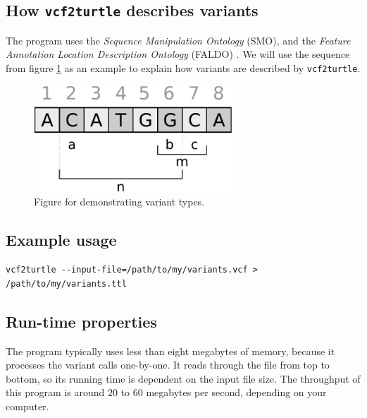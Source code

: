 \documentclass[11pt,a4paper,oneside]{book}
\begin{document}
\subsection{How \texttt{vcf2turtle} describes variants}

  The program uses the \emph{Sequence Manipulation Ontology} (SMO)\cite{unknown},
  and the \emph{Feature Annotation Location Description Ontology} (FALDO)%
  \cite{unknown}.  We will use the sequence from figure \ref{fig:sequence} as
  an example to explain how variants are described by \texttt{vcf2turtle}.

\begin{figure}[H]
  \begin{center}
    \includegraphics[height=4cm]{figures/sequence.pdf}
    \caption{\small Figure for demonstrating variant types.}
    \label{fig:sequence}
  \end{center}
\end{figure}

\subsection{Example usage}

\begin{siderules}
\begin{verbatim}
vcf2turtle --input-file=/path/to/my/variants.vcf > /path/to/my/variants.ttl
\end{verbatim}
\end{siderules}

\subsection{Run-time properties}

  The program typically uses less than eight megabytes of memory, because it
  processes the variant calls one-by-one.  It reads through the file from top
  to bottom, so its running time is dependent on the input file size.  The
  throughput of this program is around $20$ to $60$ megabytes per second,
  depending on your computer.
\end{document}
